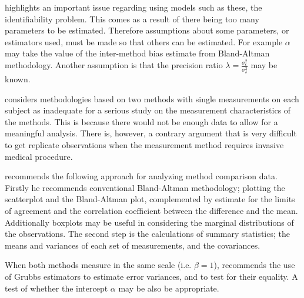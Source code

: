 \documentclass[MAIN.tex]{subfiles}
\begin{document}
	\citet{DunnSEME} highlights an important issue regarding using
	models such as these, the identifiability problem. This comes as a
	result of there being too many parameters to be estimated.
	Therefore assumptions about some parameters, or estimators used,
	must be made so that others can be estimated. For example $\alpha$
	may take the value of the inter-method bias estimate from
	Bland-Altman methodology. Another assumption is that the precision
	ratio $\lambda=\frac{\sigma^{2}_{\epsilon}}{\sigma^{2}_{\delta}}$
	may be known.
	
	
	\citet{DunnSEME} considers methodologies based on two methods with single measurements on each subject as inadequate for a serious study
	on the measurement characteristics of the methods. This is because there would not be enough data to allow for a meaningful analysis.
	There is, however, a contrary argument that is very difficult to get replicate
	observations when the measurement method requires invasive medical procedure.
	
	\citet{DunnSEME} recommends the following approach for analyzing
	method comparison data. Firstly he recommends conventional
	Bland-Altman methodology; plotting the scatterplot and the
	Bland-Altman plot, complemented by estimate for the limits of
	agreement and the correlation coefficient between the difference
	and the mean. Additionally boxplots may be useful in considering
	the marginal distributions of the observations. The second step is
	the calculations of summary statistics; the means and variances of
	each set of measurements, and the covariances.
	
	When both methods measure in the same scale (i.e. $\beta = 1$),
	\citet{DunnSEME} recommends the use of Grubbs estimators to
	estimate error variances, and to test for their equality. A test
	of whether the intercept $\alpha$ may be also be appropriate.
	
	
	
	
\end{document}
